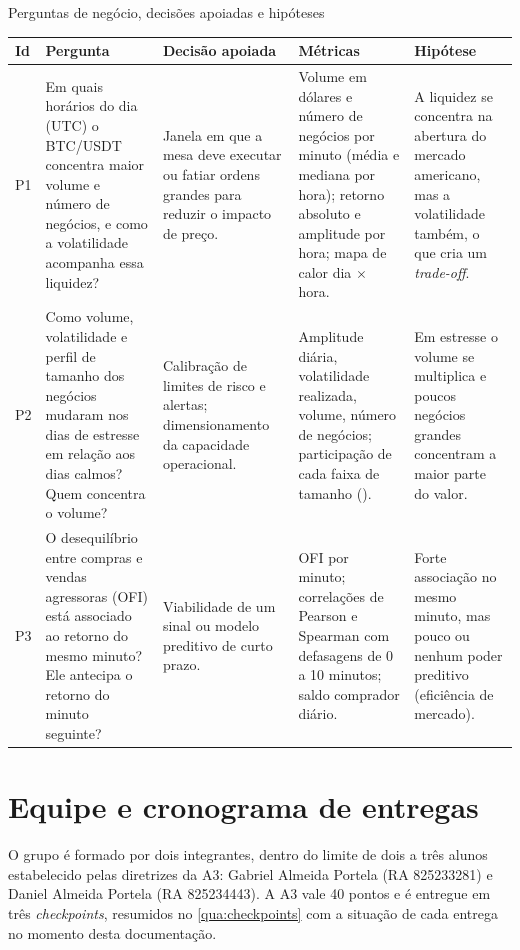 \begin{quadro}[htbp]
\caption{\label{qua:perguntas}Perguntas de negócio, decisões apoiadas e hipóteses}
\begin{corpotabela}
\begin{tabularx}{\textwidth}{|C{0.6cm}|Y|L{3.3cm}|L{3.6cm}|L{3.2cm}|}
\hline
\textbf{Id} & \textbf{Pergunta} & \textbf{Decisão apoiada} & \textbf{Métricas} & \textbf{Hipótese} \\ \hline
P1 & Em quais horários do dia (UTC) o BTC/USDT concentra maior volume e número
de negócios, e como a volatilidade acompanha essa liquidez? &
Janela em que a mesa deve executar ou fatiar ordens grandes para reduzir o
impacto de preço. &
Volume em dólares e número de negócios por minuto (média e mediana por hora);
retorno absoluto e amplitude por hora; mapa de calor dia $\times$ hora. &
A liquidez se concentra na abertura do mercado americano, mas a volatilidade
também, o que cria um \textit{trade-off}. \\ \hline
P2 & Como volume, volatilidade e perfil de tamanho dos negócios mudaram nos
dias de estresse em relação aos dias calmos? Quem concentra o volume? &
Calibração de limites de risco e alertas; dimensionamento da capacidade
operacional. &
Amplitude diária, volatilidade realizada, volume, número de negócios;
participação de cada faixa de tamanho (). &
Em estresse o volume se multiplica e poucos negócios grandes concentram a
maior parte do valor. \\ \hline
P3 & O desequilíbrio entre compras e vendas agressoras (OFI) está associado ao
retorno do mesmo minuto? Ele antecipa o retorno do minuto seguinte? &
Viabilidade de um sinal ou modelo preditivo de curto prazo. &
OFI por minuto; correlações de Pearson e Spearman com defasagens de 0 a 10
minutos; saldo comprador diário. &
Forte associação no mesmo minuto, mas pouco ou nenhum poder preditivo
(eficiência de mercado). \\ \hline
\end{tabularx}
\end{corpotabela}
\fonteautores[Elaborado]
\end{quadro}

\section{Equipe e cronograma de entregas}\label{sec:equipe}

O grupo é formado por dois integrantes, dentro do limite de dois a três alunos
estabelecido pelas diretrizes da A3: Gabriel Almeida Portela (RA 825233281) e
Daniel Almeida Portela (RA 825234443). A A3 vale 40 pontos e é entregue em três
\textit{checkpoints}, resumidos no \autoref{qua:checkpoints} com a situação de
cada entrega no momento desta documentação.

